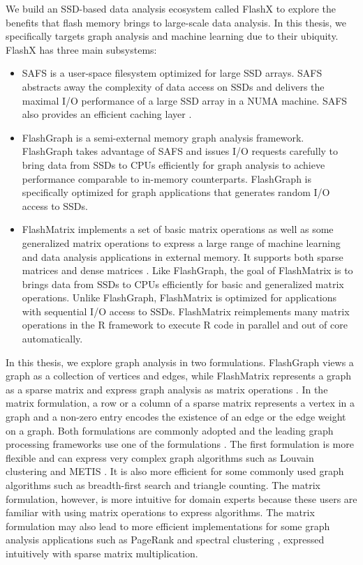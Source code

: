 We build an SSD-based data analysis ecosystem called FlashX to explore the benefits
that flash memory brings to large-scale data analysis. In this thesis,
we specifically targets graph analysis and machine learning due to their ubiquity.
FlashX has three main subsystems:
\begin{itemize}
	\item SAFS \cite{safs} is a user-space filesystem optimized for large SSD
		arrays. SAFS abstracts away the complexity of data access on SSDs and
		delivers the maximal I/O performance of a large SSD array in a NUMA
		machine. SAFS also provides an efficient caching layer \cite{SA-cache}.
	\item FlashGraph \cite{flashgraph} is a semi-external memory graph analysis
		framework. FlashGraph takes advantage of SAFS and issues I/O requests
		carefully to bring data from SSDs to CPUs efficiently for graph analysis
		to achieve performance comparable to in-memory counterparts. FlashGraph
		is specifically optimized for graph applications that generates random
		I/O access to SSDs.
	\item FlashMatrix implements a set of basic matrix operations as well as
		some generalized matrix operations to express a large range of machine
		learning and data analysis applications in external memory. It supports
		both sparse matrices \cite{SEM_SpMM} and dense matrices \cite{flashmatrix}.
		Like FlashGraph, the goal of FlashMatrix is to brings data from SSDs to
		CPUs efficiently for basic and generalized matrix operations. Unlike
		FlashGraph, FlashMatrix is optimized for applications with sequential
		I/O access to SSDs. FlashMatrix reimplements many matrix operations
		in the R framework to execute R code in parallel and out of core
		automatically.
\end{itemize}

In this thesis, we explore graph analysis in two formulations. FlashGraph views
a graph as a collection of vertices and edges, while FlashMatrix represents
a graph as a sparse matrix and express graph analysis as matrix operations
\cite{Mattson13}. In the matrix formulation, a row or a column of a sparse
matrix represents a vertex in a graph and a non-zero entry encodes the existence
of an edge or the edge weight on a graph. Both formulations are commonly adopted
and the leading graph processing frameworks use one of the formulations
\cite{pregal, powergraph, graphx, graphchi, xstream, pegasus, heigen}.
The first formulation is more flexible and can express very complex graph
algorithms such as Louvain clustering \cite{louvain} and METIS \cite{metis}.
It is also more efficient for some commonly used graph algorithms such as
breadth-first search and triangle counting. The matrix formulation, however,
is more intuitive for domain experts because these users are familiar with
using matrix operations to express algorithms. The matrix
formulation may also lead to more efficient implementations for some graph
analysis applications such as PageRank \cite{pagerank} and spectral clustering
\cite{spectral}, expressed intuitively with sparse matrix multiplication.

